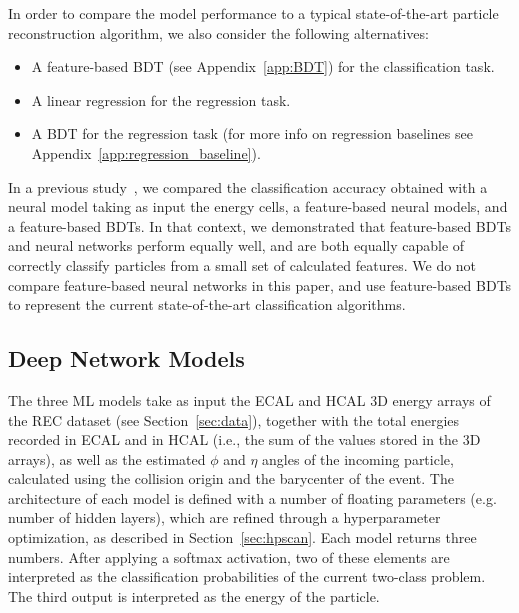 In order to compare the model performance to a typical state-of-the-art particle reconstruction algorithm, we also consider the following alternatives:
\begin{itemize}
    \item A feature-based BDT (see Appendix~\ref{app:BDT}) for the classification task.
    \item A linear regression for the regression task.
    \item A BDT for the regression task (for more info on regression baselines see Appendix~\ref{app:regression_baseline}).
\end{itemize}

In a previous study~\cite{NIPS}, we compared the classification accuracy obtained with a neural model taking as input the energy cells, a feature-based neural models, and a feature-based BDTs. In that context, we demonstrated that feature-based BDTs and neural networks perform equally well, and are both equally capable of correctly classify particles from a small set of calculated features. 
We do not compare feature-based neural networks in this paper, and use feature-based BDTs to represent the current state-of-the-art classification algorithms.

\subsection{Deep Network Models}

The three ML models take as input the ECAL and HCAL 3D energy arrays of the REC dataset (see Section~\ref{sec:data}), together with the total energies recorded in ECAL and in HCAL (i.e., the sum of the values stored in the 3D arrays), as well as the estimated $\phi$ and $\eta$ angles of the incoming particle, calculated using the collision origin and the barycenter of the event. The architecture of each model is defined with a number of floating parameters (e.g. number of hidden layers), which are refined through a hyperparameter optimization, as described in Section~\ref{sec:hpscan}. Each model returns three numbers. After applying a softmax activation, two of these elements are interpreted as the classification probabilities of the current two-class problem. The third output is interpreted as the energy of the particle.

